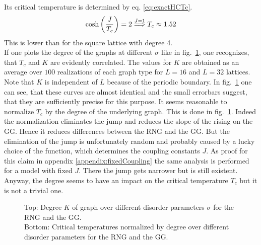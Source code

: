     Its critical temperature is determined by eq. \eqref{eq:exactHCTc}.
    \begin{equation}
        \cosh\left(\frac{J}{T_c}\right)=2 \overset{J=1}{\Longrightarrow} T_c \approx 1.52
        \label{eq:exactHCTc}
    \end{equation}
    This is lower than for the square lattice with degree 4.\\
    If one plots the degree of the graphs at different \(\sigma\) like
    in fig.\ \ref{fig:Tc_deg},
    one recognizes, that \(T_c\) and \(K\) are evidently correlated.
    The values for \(K\) are obtained as an average over \(100\)
    realizations of each graph type for \(L=16\) and \(L=32\) lattices.
    Note that \(K\) is independent of \(L\) because of the periodic boundary.
    In fig.\ \ref{fig:Tc_deg}
    one can see, that these curves are almost identical and the small
    errorbars suggest, that they are sufficiently precise for this purpose.
    It seems reasonable to normalize \(T_c\) by the degree of the underlying
    graph. This is done in fig.\ \ref{fig:Tc_deg}.
    Indeed the normalization eliminates the jump and reduces the
    slope of the rising on the GG. Hence it reduces differences
    between the RNG and the GG. But the elimination of the jump is
    unfortunately random and probably caused by a lucky choice of the
    function, which determines the coupling constants \(J\). As proof for
    this claim in appendix \ref{appendix:fixedCoupling} the same analysis
    is performed for a model with fixed \(J\). There the jump gets narrower
    but is still existent. Anyway, the degree seems to have an impact on
    the critical temperature \(T_c\) but it is not a trivial one.
    \begin{figure}[htbp]
        \centering


        \caption[Critical Temperature Normalized by Degree of the Graph]
        {
            Top: Degree \(K\) of graph over different
            disorder parameters \(\sigma\) for
             the RNG and
             the GG.\\
            Bottom: Critical temperatures normalized by degree over different
            disorder parameters for
             the RNG and
             the GG.
        }
        \label{fig:Tc_deg}
    \end{figure}\\
